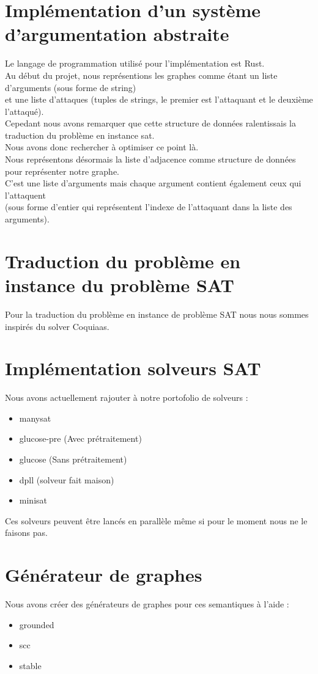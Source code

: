 \documentclass[11pt]{article}
\begin{document}
\section{Implémentation d'un système d'argumentation abstraite}
Le langage de programmation utilisé pour l'implémentation est Rust.\\
Au début du projet, nous représentions les graphes comme étant un liste d'arguments (sous forme de string) \\
et une liste d'attaques (tuples de strings, le premier est l'attaquant et le deuxième l'attaqué).\\
Cepedant nous avons remarquer que cette structure de données ralentissais la traduction du problème en instance sat.\\
Nous avons donc rechercher à optimiser ce point là.\\
Nous représentons désormais la liste d'adjacence comme structure de données pour représenter notre graphe.\\
C'est une liste d'arguments mais chaque argument contient également ceux qui l'attaquent\\
(sous forme d'entier qui représentent l'indexe de l'attaquant dans la liste des arguments).
\section{Traduction du problème en instance du problème SAT}
Pour la traduction du problème en instance de problème SAT nous nous sommes inspirés du solver Coquiaas.\cite{lagniez2015coquiaas}\\

\section{Implémentation solveurs SAT}
Nous avons actuellement rajouter à notre portofolio de solveurs :
\begin{itemize}
	\item manysat
	\item glucose-pre (Avec prétraitement)
	\item glucose (Sans prétraitement)
	\item dpll (solveur fait maison)
	\item minisat
\end{itemize}

Ces solveurs peuvent être lancés en parallèle même si pour le moment nous ne le faisons pas.
\section{Générateur de graphes}
Nous avons créer des générateurs de graphes pour ces semantiques à l'aide \cite{arg2017Generator}:
\begin{itemize}
	\item grounded
	\item scc
	\item stable
\end{itemize}
\end{document}
